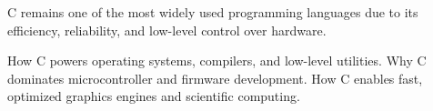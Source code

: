 \begin{NxSSBox}
	\begin{NxIDBox}
		C remains one of the most widely used programming languages due to its efficiency, reliability, and low-level control over hardware.
	\end{NxIDBox}
	\begin{NxIDBoxL}
		 How C powers operating systems, compilers, and low-level utilities.
		Why C dominates microcontroller and firmware development.
		 How C enables fast, optimized graphics engines and scientific computing.
	\end{NxIDBoxL}
\end{NxSSBox}





